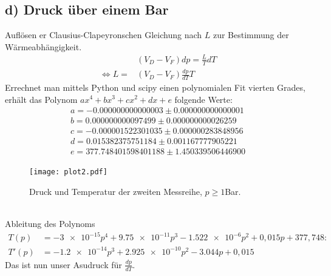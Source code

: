 \subsection{d) Druck über einem Bar}
Auflösen er Clausius-Clapeyronschen Gleichung nach $L$ zur Bestimmung der Wärmeabhängigkeit.\\
\begin{align}
  &(V_D-V_F)dp=\frac{L}{T}dT\nonumber\\
  \Leftrightarrow L=&(V_D-V_F)\frac{dp}{dT}T
\end{align}
Errechnet man mittels Python und scipy einen polynomialen Fit vierten Grades, erhält das Polynom $ax^4+bx^3+cx^2+dx+e$ folgende Werte:
\begin{align*}
a = -0.000000000000003 ± 0.000000000000001\\
b = 0.000000000097499 ± 0.000000000026259\\
c = -0.000001522301035 ± 0.000000283848956\\
d = 0.015382375751184 ± 0.001167777905221\\
e = 377.748401598401188 ± 1.450339506446900
\end{align*}
\begin{figure}[h]
    \centering
    \texttt{[image: plot2.pdf]}
    \caption{Druck und Temperatur der zweiten Messreihe, $p\geq 1$Bar.}
\end{figure}
\\
Ableitung des Polynoms 
\begin{align}
T(p)&=-\num{3e-15}p^4+\num{9.75e-11}p^3-\num{1.522e-6}p^2+0,015p+377,748:\nonumber\\
T'(p)&=-\num{1.2e-14}p^3+\num{2.925e-10}p^2-\num{3.044}p+0,015
\end{align}
Das ist nun unser Asudruck für $\frac{dp}{dT}$.
